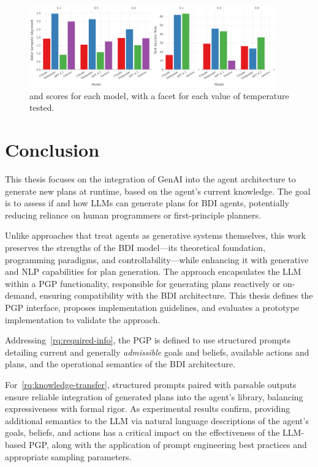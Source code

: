 \documentclass[12pt,a4paper,openright,twoside]{book}
\begin{document}
\begin{figure}[htbp]
    \centering
    \includegraphics[width=0.95\textwidth]{figures/temperature-stats2.pdf}
    \caption{\BSA{} and \TSR{} scores for each model, with a facet for each value of temperature tested.}
    \label{fig:temp-stats-cont}
\end{figure}

\chapter{Conclusion}\label{chap:conclusion}

This thesis focuses on the integration of \ac{GenAI} into the \agentspeak{} agent architecture to generate new plans at runtime, based on the agent's current knowledge.
%
The goal is to assess if and how \acp{LLM} can generate plans for \ac{BDI} agents, potentially reducing reliance on human programmers or first-principle planners.

Unlike approaches that treat agents as generative systems themselves, this work preserves the strengths of the \ac{BDI} model---its theoretical foundation, programming paradigms, and controllability---while enhancing it with generative and \ac{NLP} capabilities for plan generation.
%
The approach encapsulates the \ac{LLM} within a \ac{PGP} functionality, responsible for generating plans reactively or on-demand, ensuring compatibility with the \ac{BDI} architecture.
%
This thesis defines the \ac{PGP} interface, proposes implementation guidelines, and evaluates a prototype implementation to validate the approach.

Addressing~\cref{rq:required-info}, the \ac{PGP} is defined to use structured prompts detailing current and generally \emph{admissible} goals and beliefs, available actions and plans, and the operational semantics of the \ac{BDI} architecture.

For~\cref{rq:knowledge-transfer}, structured prompts paired with parsable outputs ensure reliable integration of generated plans into the agent's library, balancing expressiveness with formal rigor.
%
As experimental results confirm, providing additional semantics to the \ac{LLM} via natural language descriptions of the agent's goals, beliefs, and actions has a critical impact on the effectiveness of the LLM-based PGP, along with the application of prompt engineering best practices and appropriate sampling parameters.
\end{document}
